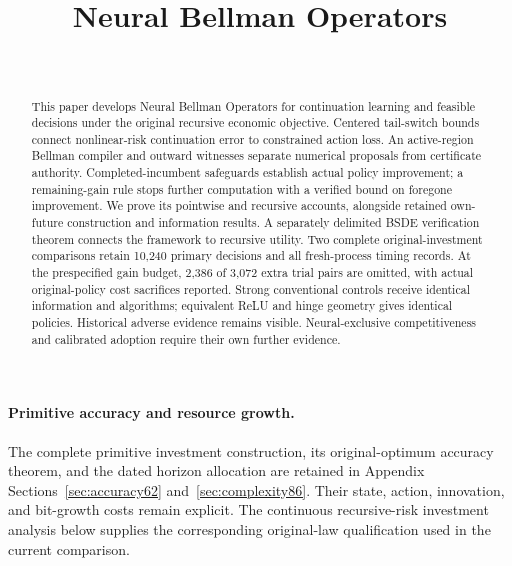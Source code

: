 \documentclass[ecta,nameyear,draft]{econsocart}
\begin{document}
\begin{frontmatter}
\title{Neural Bellman Operators}
\begin{aug}
\author[id=au1,addressref={add1}]{~}
\address[id=add1]{Peking University}
\end{aug}
\begin{abstract}
This paper develops Neural Bellman Operators for continuation learning and feasible decisions under the original recursive economic objective. Centered tail-switch bounds connect nonlinear-risk continuation error to constrained action loss. An active-region Bellman compiler and outward witnesses separate numerical proposals from certificate authority. Completed-incumbent safeguards establish actual policy improvement; a remaining-gain rule stops further computation with a verified bound on foregone improvement. We prove its pointwise and recursive accounts, alongside retained own-future construction and information results. A separately delimited BSDE verification theorem connects the framework to recursive utility. Two complete original-investment comparisons retain 10,240 primary decisions and all fresh-process timing records. At the prespecified gain budget, 2,386 of 3,072 extra trial pairs are omitted, with actual original-policy cost sacrifices reported. Strong conventional controls receive identical information and algorithms; equivalent ReLU and hinge geometry gives identical policies. Historical adverse evidence remains visible. Neural-exclusive competitiveness and calibrated adoption require their own further evidence.
\end{abstract}
\begin{keyword}
\end{keyword}
\end{frontmatter}


\paragraph{Primitive accuracy and resource growth.}
The complete primitive investment construction, its original-optimum accuracy theorem, and the dated horizon allocation are retained in Appendix Sections~\ref{sec:accuracy62} and~\ref{sec:complexity86}. Their state, action, innovation, and bit-growth costs remain explicit. The continuous recursive-risk investment analysis below supplies the corresponding original-law qualification used in the current comparison.
\end{document}
